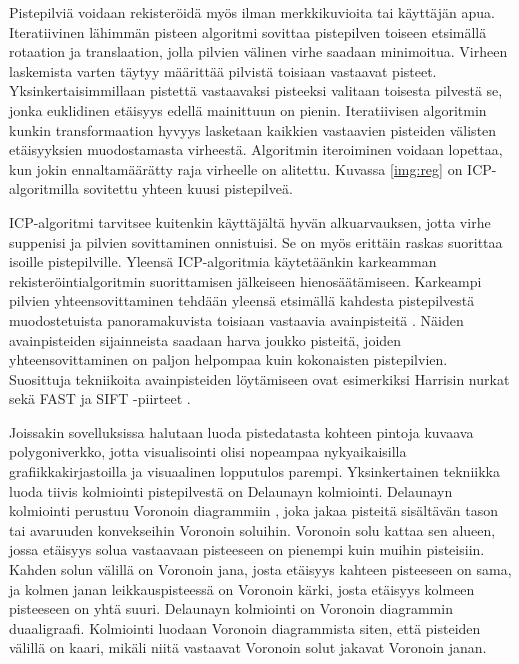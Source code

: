 Pistepilviä voidaan rekisteröidä myös ilman merkkikuvioita tai käyttäjän apua. Iteratiivinen lähimmän pisteen algoritmi  sovittaa pistepilven toiseen etsimällä rotaation ja translaation, jolla pilvien välinen virhe saadaan minimoitua. Virheen laskemista varten täytyy määrittää pilvistä toisiaan vastaavat pisteet. Yksinkertaisimmillaan pistettä vastaavaksi pisteeksi valitaan toisesta pilvestä se, jonka euklidinen etäisyys edellä mainittuun on pienin. Iteratiivisen algoritmin kunkin transformaation hyvyys lasketaan kaikkien vastaavien pisteiden välisten etäisyyksien muodostamasta virheestä. Algoritmin iteroiminen voidaan lopettaa, kun jokin ennaltamäärätty raja virheelle on alitettu. Kuvassa \ref{img:reg} on ICP-algoritmilla sovitettu yhteen kuusi pistepilveä. \cite{icp}


ICP-algoritmi tarvitsee kuitenkin käyttäjältä hyvän alkuarvauksen, jotta virhe suppenisi ja pilvien sovittaminen onnistuisi. Se on myös erittäin raskas suorittaa isoille pistepilville. Yleensä ICP-algoritmia käytetäänkin karkeamman rekisteröintialgoritmin suorittamisen jälkeiseen hienosäätämiseen. Karkeampi pilvien yhteensovittaminen tehdään yleensä etsimällä kahdesta pistepilvestä muodostetuista panoramakuvista toisiaan vastaavia avainpisteitä . Näiden avainpisteiden sijainneista saadaan harva joukko pisteitä, joiden yhteensovittaminen on paljon helpompaa kuin kokonaisten pistepilvien. Suosittuja tekniikoita avainpisteiden löytämiseen ovat esimerkiksi Harrisin nurkat \cite{harris} sekä FAST ja SIFT -piirteet \cite{fast}\cite{sift}. \cite{weinmann}

Joissakin sovelluksissa halutaan luoda pistedatasta kohteen pintoja kuvaava polygoniverkko, jotta visualisointi olisi nopeampaa nykyaikaisilla grafiikkakirjastoilla ja visuaalinen lopputulos parempi. Yksinkertainen tekniikka luoda tiivis kolmiointi pistepilvestä on Delaunayn kolmiointi. Delaunayn kolmiointi perustuu Voronoin diagrammiin , joka jakaa pisteitä sisältävän tason tai avaruuden konvekseihin Voronoin soluihin. Voronoin solu kattaa sen alueen, jossa etäisyys solua vastaavaan pisteeseen on pienempi kuin muihin pisteisiin. Kahden solun välillä on Voronoin jana, josta etäisyys kahteen pisteeseen on sama, ja kolmen janan leikkauspisteessä on Voronoin kärki, josta etäisyys kolmeen pisteeseen on yhtä suuri. Delaunayn kolmiointi on Voronoin diagrammin duaaligraafi. Kolmiointi luodaan Voronoin diagrammista siten, että pisteiden välillä on kaari, mikäli niitä vastaavat Voronoin solut jakavat Voronoin janan. \cite{delaunay}

